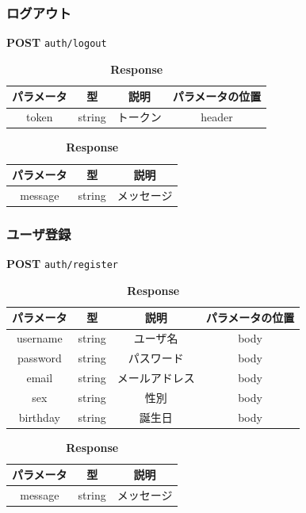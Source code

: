 \subsubsection*{ログアウト}
\textbf{POST} \texttt{auth/logout}
\begin{table}[H]
  \begin{minipage}
    {0.5\hsize} \centering
    \captionsetup{labelformat=empty,labelsep=none}
    \caption{\textbf{Request}}
    \begin{tabular}{|c|c|c|c|} \hline
      パラメータ & 型      & 説明   & パラメータの位置 \\ \hline \hline
      token & string & トークン & header   \\ \hline
    \end{tabular}
  \end{minipage}
  \begin{minipage}
    {0.5\hsize} \centering
    \captionsetup{labelformat=empty,labelsep=none}
    \caption{\textbf{Response}}
    \begin{tabular}{|c|c|c|} \hline
      パラメータ   & 型      & 説明    \\ \hline \hline
      message & string & メッセージ \\ \hline
    \end{tabular}
  \end{minipage}
\end{table}

\subsubsection*{ユーザ登録}
\textbf{POST} \texttt{auth/register}
\begin{table}[H]
  \begin{minipage}
    {0.5\hsize} \centering
    \captionsetup{labelformat=empty,labelsep=none}
    \caption{\textbf{Request}}
    \begin{tabular}{|c|c|c|c|} \hline
      パラメータ    & 型      & 説明      & パラメータの位置 \\ \hline \hline
      username & string & ユーザ名    & body     \\ \hline
      password & string & パスワード   & body     \\ \hline
      email    & string & メールアドレス & body     \\ \hline
      sex      & string & 性別      & body     \\ \hline
      birthday & string & 誕生日     & body     \\ \hline
    \end{tabular}
  \end{minipage}
  \begin{minipage}
    {0.5\hsize} \centering
    \captionsetup{labelformat=empty,labelsep=none}
    \caption{\textbf{Response}}
    \begin{tabular}{|c|c|c|} \hline
      パラメータ   & 型      & 説明    \\ \hline \hline
      message & string & メッセージ \\ \hline
    \end{tabular}
  \end{minipage}
\end{table}


